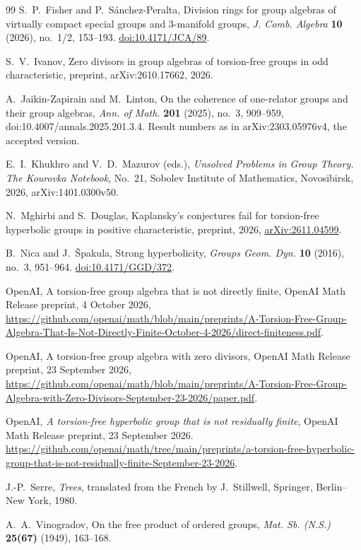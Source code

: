 \begin{thebibliography}{99}
S.~P.~Fisher and P.~S\'anchez-Peralta,
Division rings for group algebras of virtually compact special groups
and \(3\)-manifold groups,
\emph{J. Comb. Algebra} \textbf{10} (2026), no.~1/2, 153--193.
\href{https://doi.org/10.4171/JCA/89}{doi:10.4171/JCA/89}.

S.~V.~Ivanov,
Zero divisors in group algebras of torsion-free groups in odd characteristic,
preprint, arXiv:2610.17662, 2026.

A.~Jaikin-Zapirain and M.~Linton,
On the coherence of one-relator groups and their group algebras,
\emph{Ann. of Math.} \textbf{201} (2025), no.~3, 909--959, doi:10.4007/annals.2025.201.3.4. Result numbers as in arXiv:2303.05976v4, the accepted version.

E.~I.~Khukhro and V.~D.~Mazurov (eds.),
\emph{Unsolved Problems in Group Theory. The Kourovka Notebook}, No.~21,
Sobolev Institute of Mathematics, Novosibirsk, 2026, arXiv:1401.0300v50.

N.~Mghirbi and S.~Douglas,
Kaplansky's conjectures fail for torsion-free hyperbolic groups in positive characteristic,
preprint, 2026, \href{https://arxiv.org/abs/2611.04599}{arXiv:2611.04599}.

B.~Nica and J.~\v Spakula,
Strong hyperbolicity,
\emph{Groups Geom. Dyn.} \textbf{10} (2016), no.~3, 951--964.
\href{https://doi.org/10.4171/GGD/372}{doi:10.4171/GGD/372}.

OpenAI,
A torsion-free group algebra that is not directly finite,
OpenAI Math Release preprint, 4 October 2026, \url{https://github.com/openai/math/blob/main/preprints/A-Torsion-Free-Group-Algebra-That-Is-Not-Directly-Finite-October-4-2026/direct-finiteness.pdf}.

OpenAI,
A torsion-free group algebra with zero divisors,
OpenAI Math Release preprint, 23 September 2026, \url{https://github.com/openai/math/blob/main/preprints/A-Torsion-Free-Group-Algebra-with-Zero-Divisors-September-23-2026/paper.pdf}.

OpenAI,
\emph{A torsion-free hyperbolic group that is not residually finite},
OpenAI Math Release preprint, 23 September 2026.
\url{https://github.com/openai/math/tree/main/preprints/a-torsion-free-hyperbolic-group-that-is-not-residually-finite-September-23-2026}.

J.-P.~Serre,
\emph{Trees}, translated from the French by J.~Stillwell,
Springer, Berlin--New York, 1980.

A.~A.~Vinogradov,
On the free product of ordered groups,
\emph{Mat. Sb. (N.S.)} \textbf{25(67)} (1949), 163--168.

\end{thebibliography}

